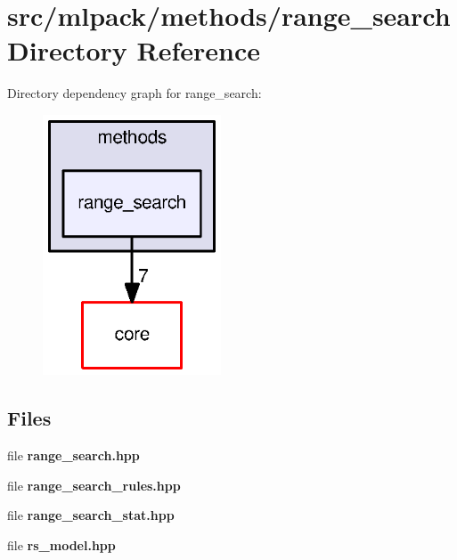 \section{src/mlpack/methods/range\+\_\+search Directory Reference}
\label{dir_b810cce4cae1d8b45f5dab38895e0781}
Directory dependency graph for range\+\_\+search\+:
\nopagebreak
\begin{figure}[H]
\begin{center}
\leavevmode
\includegraphics[width=150pt]{dir_b810cce4cae1d8b45f5dab38895e0781_dep}
\end{center}
\end{figure}
\subsection*{Files}
\begin{DoxyCompactItemize}
\item 
file {\bf range\+\_\+search.\+hpp}
\item 
file {\bf range\+\_\+search\+\_\+rules.\+hpp}
\item 
file {\bf range\+\_\+search\+\_\+stat.\+hpp}
\item 
file {\bf rs\+\_\+model.\+hpp}
\end{DoxyCompactItemize}
